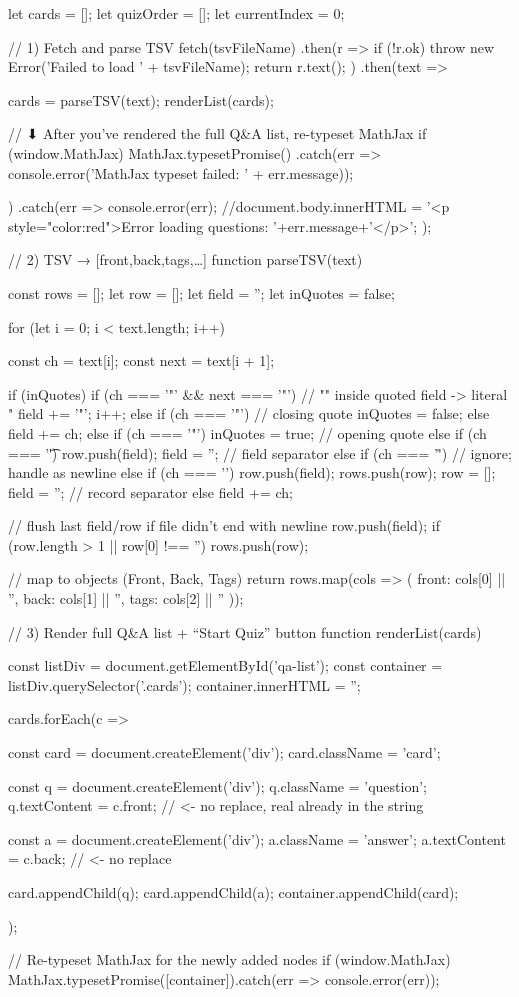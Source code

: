 \documentclass{tstextbook}
\begin{document}
    let cards = [];
    let quizOrder = [];
    let currentIndex = 0;

    // 1) Fetch and parse TSV
fetch(tsvFileName)
  .then(r => {
    if (!r.ok) throw new Error('Failed to load ' + tsvFileName);
    return r.text();
  })
  .then(text => {
    cards = parseTSV(text);
    renderList(cards);

    // ⬇ After you’ve rendered the full Q&A list, re-typeset MathJax
    if (window.MathJax) {
      MathJax.typesetPromise()
        .catch(err => console.error('MathJax typeset failed: ' + err.message));
    }
  })
  .catch(err => {
    console.error(err);
    //document.body.innerHTML =  '<p style="color:red">Error loading questions: '+err.message+'</p>';
  });

    // 2) TSV → [{front,back,tags},…]
    function parseTSV(text) {
  const rows = [];
  let row = [];
  let field = '';
  let inQuotes = false;

  for (let i = 0; i < text.length; i++) {
    const ch = text[i];
    const next = text[i + 1];

    if (inQuotes) {
      if (ch === '"' && next === '"') {
        // "" inside quoted field -> literal "
        field += '"';
        i++;
      } else if (ch === '"') {
        // closing quote
        inQuotes = false;
      } else {
        field += ch;
      }
    } else {
      if (ch === '"') {
        inQuotes = true;                // opening quote
      } else if (ch === '\t') {
        row.push(field); field = '';    // field separator
      } else if (ch === '\r') {
        // ignore; handle \n as newline
      } else if (ch === '\n') {
        row.push(field); rows.push(row);
        row = []; field = '';           // record separator
      } else {
        field += ch;
      }
    }
  }
  // flush last field/row if file didn't end with newline
  row.push(field);
  if (row.length > 1 || row[0] !== '') rows.push(row);

  // map to objects (Front, Back, Tags)
  return rows.map(cols => ({
    front: cols[0] || '',
    back:  cols[1] || '',
    tags:  cols[2] || ''
  }));
}
// 3) Render full Q&A list + “Start Quiz” button
function renderList(cards) {
  const listDiv = document.getElementById('qa-list');
  const container = listDiv.querySelector('.cards');
  container.innerHTML = '';

  cards.forEach(c => {
    const card = document.createElement('div');
    card.className = 'card';

    const q = document.createElement('div');
    q.className = 'question';
    q.textContent = c.front;   // <- no replace, real \n already in the string

    const a = document.createElement('div');
    a.className = 'answer';
    a.textContent = c.back;    // <- no replace

    card.appendChild(q);
    card.appendChild(a);
    container.appendChild(card);
  });

  // Re-typeset MathJax for the newly added nodes
  if (window.MathJax) {
    MathJax.typesetPromise([container]).catch(err => console.error(err));
  }
}
\end{document}
